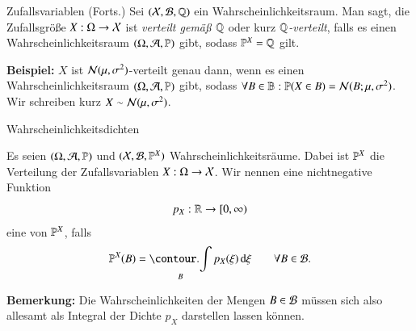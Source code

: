 \begin{frame}{Zufallsvariablen (Forts.)}{}
	Sei $(\mathcal{X}, \mathcal{B}, \mathbb{Q})$ ein Wahrscheinlichkeitsraum. Man sagt, die Zufallsgröße $X : \Omega \rightarrow \mathcal{X}$ ist
	\textit{verteilt gemäß $\mathbb{Q}$} oder kurz \textit{$\mathbb{Q}$-verteilt}, falls es einen Wahrscheinlichkeitsraum $(\Omega, \mathcal{A}, \mathbb{P})$ gibt,
	sodass $\mathbb{P}^X = \mathbb{Q}$ gilt.
	
	\begin{boxGray}
		\textbf{Beispiel:}
		$X$ ist $\mathcal{N}(\mu, \sigma^2)$-verteilt genau dann,
		wenn es einen Wahrscheinlichkeitsraum $(\Omega, \mathcal{A}, \mathbb{P})$ gibt,
		sodass $\forall B \in \mathbb{B} : \mathbb{P}(X \in B) = \mathcal{N}(B; \mu, \sigma^2)$. Wir schreiben kurz $X \sim \mathcal{N}(\mu, \sigma^2)$.
	\end{boxGray}
\end{frame}


\begin{frame}{Wahrscheinlichkeitsdichten}{}
	\begin{mydef}
		Es seien $(\Omega, \mathcal{A}, \mathbb{P})$ und $(\mathcal{X}, \mathcal{B}, \mathbb{P}^X)$ Wahrscheinlichkeitsräume.
		Dabei ist $\mathbb{P}^X$ die Verteilung der Zufallsvariablen $X : \Omega \rightarrow \mathcal{X}$.
		Wir nennen eine nichtnegative Funktion $$p_X : \mathbb{R} \rightarrow [0, \infty)$$ eine 
		von $\mathbb{P}^X$, falls
		\begin{equation*}
			\Prob^X(B) = \int_B p_X(\xi)\,\diff\xi \qquad \forall B \in \sB.
		\end{equation*}
	\end{mydef}

	\begin{boxGray}
		\textbf{Bemerkung:} Die Wahrscheinlichkeiten der Mengen $B \in \mathcal{B}$ müssen sich also allesamt als Integral
		der Dichte $p_X$ darstellen lassen können.
	\end{boxGray}
\end{frame}



